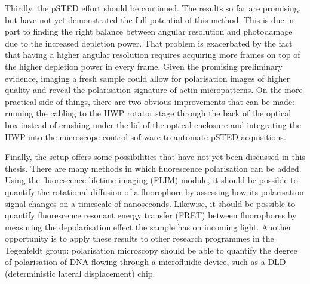 Thirdly, the pSTED effort should be continued. The results so far are promising, but have not yet demonstrated the full potential of this method. This is due in part to finding the right balance between angular resolution and photodamage due to the increased depletion power. That problem is exacerbated by the fact that having a higher angular resolution requires acquiring more frames on top of the higher depletion power in every frame. Given the promising preliminary evidence, imaging a fresh sample could allow for polarisation images of higher quality and reveal the polarisation signature of actin micropatterns. On the more practical side of things, there are two obvious improvements that can be made: running the cabling to the HWP rotator stage through the back of the optical box instead of crushing under the lid of the optical enclosure and integrating the HWP into the microscope control software to automate pSTED acquisitions.


Finally, the setup offers some possibilities that have not yet been discussed in this thesis. There are many methods in which fluorescence polarisation can be added. Using the fluorescence lifetime imaging (FLIM) module, it should be possible to quantify the rotational diffusion of a fluorophore by assessing how its polarisation signal changes on a timescale of nanoseconds. Likewise, it should be possible to quantify fluorescence resonant energy transfer (FRET) between fluorophores by measuring the depolarisation effect the sample has on incoming light. Another opportunity is to apply these results to other research programmes in the Tegenfeldt group: polarisation microscopy should be able to quantify the degree of polarisation of DNA flowing through a microfluidic device, such as a DLD (deterministic lateral displacement) chip.